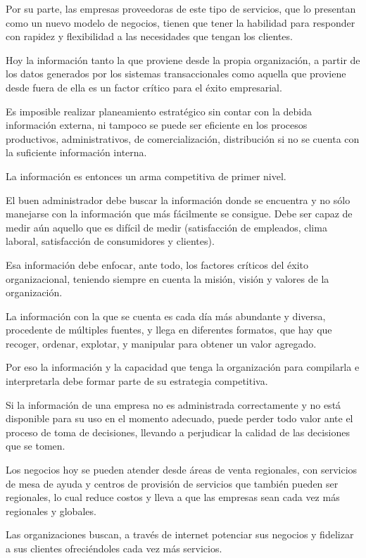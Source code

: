 \documentclass[a4paper, 12pt]{article}
\begin{document}
Por su parte, las empresas proveedoras de este tipo de servicios, que lo presentan como un nuevo modelo de negocios, tienen que tener la habilidad para responder con rapidez y flexibilidad a las necesidades que tengan los clientes.

Hoy la información tanto la que proviene desde la propia organización, a partir de los datos generados por los sistemas transaccionales como aquella que proviene desde fuera de ella es un factor crítico para el éxito empresarial.

Es imposible realizar planeamiento estratégico sin contar con la debida información externa, ni tampoco se puede ser eficiente en los procesos productivos, administrativos, de comercialización, distribución si no se cuenta con la suficiente información interna.

La información es entonces un arma competitiva de primer nivel.

El buen administrador debe buscar la información donde se encuentra y no sólo manejarse con la información que más fácilmente se consigue. Debe ser capaz de medir aún aquello que es difícil de medir (satisfacción de empleados, clima laboral, satisfacción de consumidores y clientes).

Esa información debe enfocar, ante todo, los factores críticos del éxito organizacional, teniendo siempre en cuenta la misión, visión y valores de la organización.

La información con la que se cuenta es cada día más abundante y diversa, procedente de múltiples fuentes, y llega en diferentes formatos, que hay que recoger, ordenar, explotar, y manipular para obtener un valor agregado.

Por eso la información y la capacidad que tenga la organización para compilarla e interpretarla debe formar parte de su estrategia competitiva.

Si la información de una empresa no es administrada correctamente y no está disponible para su uso en el momento adecuado, puede perder todo valor ante el proceso de toma de decisiones, llevando a perjudicar la calidad de las decisiones que se tomen.

Los negocios hoy se pueden atender desde áreas de venta regionales, con servicios de mesa de ayuda y centros de provisión de servicios que también pueden ser regionales, lo cual reduce costos y lleva a que las empresas sean cada vez más regionales y globales.

Las organizaciones buscan, a través de internet potenciar sus negocios y fidelizar a sus clientes ofreciéndoles cada vez más servicios.
\end{document}
